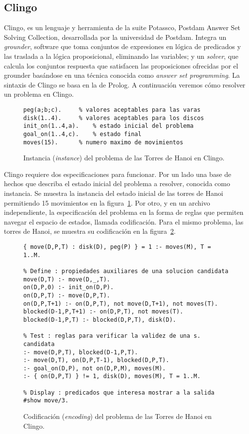 \documentclass[11pt,captions=nooneline,DIV=14, parskip=full]{scrartcl}
\begin{document}
\subsection{Clingo}
Clingo, es un lenguaje y herramienta de la suite Potassco, Postdam Answer Set Solving Collection, desarrollada por la universidad de Postdam. Integra un \textit{grounder}, software que toma conjuntos de expresiones en lógica de predicados y las traslada a la lógica proposicional, eliminando las variables; y un \textit{solver}, que calcula los conjuntos respuesta que satisfacen las proposiciones ofrecidas por el grounder basándose en una técnica conocida como \textit{answer set programming}. La sintaxis de Clingo se basa en la de Prolog. A continuación veremos cómo resolver un problema en Clingo.

\begin{figure}[!htbp]
\lstset{language=Prolog}
\begin{lstlisting}[frame=single]
peg(a;b;c).		% valores aceptables para las varas
disk(1..4).		% valores aceptables para los discos
init_on(1..4,a).	% estado inicial del problema
goal_on(1..4,c).	% estado final
moves(15).		% numero maximo de movimientos
\end{lstlisting} 
\caption{Instancia (\textit{instance}) del problema de las Torres de Hanoi en Clingo.}
\label{fig:clingoins}
\end{figure}

Clingo requiere dos especificaciones para funcionar. Por un lado una base de hechos que describa el estado inicial del problema a resolver, conocida como instancia. Se muestra la instancia del estado inicial de las torres de Hanoi permitiendo 15 movimientos en la figura~\ref{fig:clingoins}. Por otro, y en un archivo independiente, la especificación del problema en la forma de reglas que permiten navegar el espacio de estados, llamada codificación. Para el mismo problema, las torres de Hanoi, se muestra su codificación en la figura~\ref{fig:clingoenc}.

\begin{figure}[!htbp]
\lstset{language=Prolog}
\begin{lstlisting}[frame=single]
% Generate : descripcion de soluciones candidatas
{ move(D,P,T) : disk(D), peg(P) } = 1 :- moves(M), T = 1..M.

% Define : propiedades auxiliares de una solucion candidata
move(D,T) :- move(D,_,T).
on(D,P,0) :- init_on(D,P).
on(D,P,T) :- move(D,P,T).
on(D,P,T+1) :- on(D,P,T), not move(D,T+1), not moves(T).
blocked(D-1,P,T+1) :- on(D,P,T), not moves(T).
blocked(D-1,P,T) :- blocked(D,P,T), disk(D).

% Test : reglas para verificar la validez de una s. candidata
:- move(D,P,T), blocked(D-1,P,T).
:- move(D,T), on(D,P,T-1), blocked(D,P,T).
:- goal_on(D,P), not on(D,P,M), moves(M).
:- { on(D,P,T) } != 1, disk(D), moves(M), T = 1..M.

% Display : predicados que interesa mostrar a la salida
#show move/3.
\end{lstlisting} 
\caption{Codificación (\textit{encoding}) del problema de las Torres de Hanoi en Clingo.}
\label{fig:clingoenc}
\end{figure}
\end{document}
